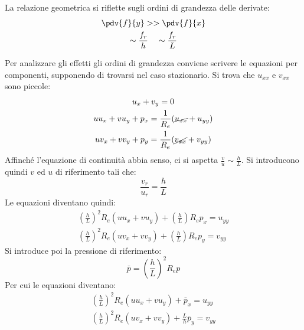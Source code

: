 %
La relazione geometrica si riflette sugli ordini di grandezza delle derivate:
%
	\begin{equation*}
		\begin{gathered}
			\pdv{f}{y} >> \pdv{f}{x}\\
			\sim \frac{f_r}{h} \quad \sim \frac{f_r}{L}
		\end{gathered}
	\end{equation*} 
%

Per analizzare gli effetti gli ordini di grandezza conviene scrivere le equazioni per componenti, supponendo di trovarsi nel caso stazionario.
Si trova che $u_{xx}$ e $v_{xx}$ sono piccole:
%
	\begin{equation*}
		\begin{gathered}
			u_x + v_y = 0\\
			u u_x + v u_y + p_x = \frac{1}{R_e} (\cancel{u_{xx}} + u_{yy})\\
			u v_x + v v_y + p_y = \frac{1}{R_e} (\cancel{v_{xx}} + v_{yy})
		\end{gathered}
	\end{equation*} 
%
Affinché l'equazione di continuità abbia senso, ci si aspetta $\frac{v}{u} \sim \frac{h}{L}$.
Si introducono quindi $v$ ed $u$ di riferimento tali che:
%
	\begin{equation*}
		\frac{v_r}{u_r} = \frac{h}{L}
	\end{equation*}
%
Le equazioni diventano quindi:
%
	\begin{equation*}
		\begin{gathered}
			{\left( \frac{h}{L}\right)}^2 R_e (u u_x + v u_y) + \left( \frac{h}{L}\right) R_e p_x = u_{yy}\\
			{\left( \frac{h}{L}\right)}^2 R_e (u v_x + v v_y) + \left( \frac{h}{L}\right) R_e p_y = v_{yy}
		\end{gathered}
	\end{equation*} 
%
Si introduce poi la pressione di riferimento:
%
	\begin{equation*}
		\bar{p} = {\left( \frac{h}{L}\right)}^2  R_e p
	\end{equation*}
%
Per cui le equazioni diventano:
%
	\begin{equation*}
		\begin{gathered}
			{\left( \frac{h}{L}\right)}^2 R_e (u u_x + v u_y) + \bar{p}_x = u_{yy}\\
			{\left( \frac{h}{L}\right)}^2 R_e (u v_x + v v_y) +  \frac{L}{h} \bar{p}_y = v_{yy}
		\end{gathered}
	\end{equation*} 
